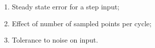 \documentclass[conference]{IEEEtran}
\begin{document}
\begin{enumerate}
\item Steady state error for a step input;
\item Effect of number of sampled points per cycle;
\item Tolerance to noise on input.
\end{enumerate}






\end{document}
